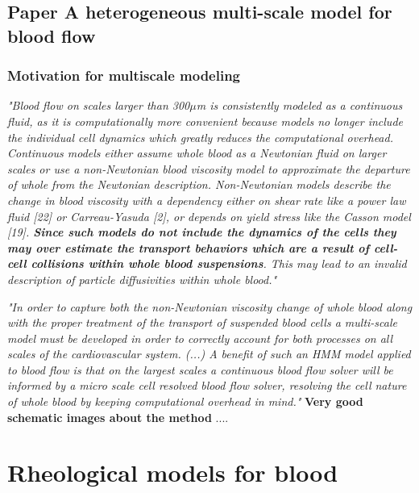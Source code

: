 \documentclass[11pt,letterpaper]{article}
\begin{document}
\newpage
\subsection{Paper A heterogeneous multi-scale model for blood flow}
\subsubsection*{Motivation for multiscale modeling}

\textit{"Blood flow on scales larger than 300$\mu$m is consistently modeled as a continuous fluid, as it is computationally more convenient because models no longer include the individual cell dynamics which greatly reduces the computational overhead.  {\color{blue}Continuous models either assume whole blood as a Newtonian fluid on larger scales or use a non-Newtonian blood viscosity model to approximate the departure of whole from the Newtonian description.  Non-Newtonian models describe the change in blood viscosity with a dependency either on shear rate like a power law fluid [22] or Carreau-Yasuda [2], or depends on yield stress like the Casson model [19]. \textbf{Since such models do not include the dynamics of the cells they may over estimate the transport behaviors which are a result of cell-cell collisions within whole blood suspensions}}. This may lead to an invalid description of particle diffusivities within whole blood."}

\textit{"In order to capture both the non-Newtonian viscosity change of whole blood along with the proper treatment of the transport of suspended blood cells a multi-scale model must be developed in order to correctly account for both processes on all scales of the cardiovascular system. (...) 
A benefit of such an HMM model applied to blood flow is that on the largest scales a continuous blood flow solver will be informed by a micro scale cell resolved blood flow solver, resolving the cell nature of whole blood by keeping computational overhead in mind."}
\newline\newline
\textbf{Very good schematic images about the method}
....










\newpage
\section{Rheological models for blood}
\end{document}
